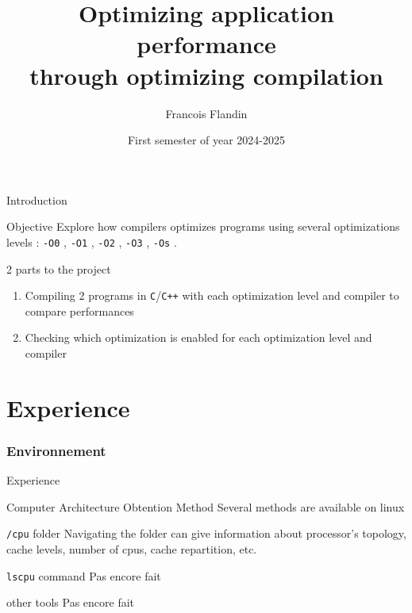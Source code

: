 \documentclass[english]{beamer}
\title{Optimizing application performance \\ through optimizing compilation}
\author{Francois Flandin}
\date{First semester of year 2024-2025}
\newcommand{\optizero}{\texttt{-O0} }
\newcommand{\optione}{\texttt{-O1} }
\newcommand{\optitwo}{\texttt{-O2} }
\newcommand{\optithree}{\texttt{-O3} }
\newcommand{\optisize}{\texttt{-Os} }
\begin{document}
    
    \maketitle
    
    \begin{frame}{Introduction}
        \begin{block}{Objective}
            Explore how compilers optimizes programs using several optimizations levels : \optizero, \optione, \optitwo, \optithree, \optisize.
        \end{block}
        \begin{block}{2 parts to the project}
            \begin{enumerate}
            \item Compiling 2 programs in \texttt{C}/\texttt{C++} with each optimization level and compiler to compare performances
            \item Checking which optimization is enabled for each optimization level and compiler
            \end{enumerate}
        \end{block}
    \end{frame}
    
    \part{Experience}
    \section{Environnement}
    \begin{frame}[standout]
    Experience
    \end{frame}
    \begin{frame}{Computer Architecture Obtention Method}
        Several methods are available on linux
        \begin{block}{\texttt{/cpu} folder}
            Navigating the folder can give information about processor's topology, cache levels, number of cpus, cache repartition, etc.
        \end{block}
        \begin{block}{\texttt{lscpu} command}
        Pas encore fait
        \end{block}
        \begin{block}{other tools}
        Pas encore fait
        \end{block}
    \end{frame}
    
\end{document}
